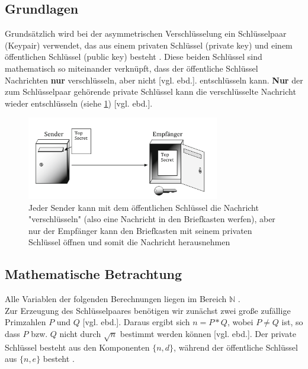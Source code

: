 \documentclass[a4paper,ngerman, headheight=28pt,12pt]{scrartcl}
\newcommand{\vcite}[1]{\cite[vgl.][]{#1}}
\newcommand{\vebd}{[vgl. ebd.]}
\begin{document}
\subsection{Grundlagen}
Grundsätzlich wird bei der asymmetrischen Verschlüsselung ein Schlüsselpaar (Keypair) verwendet, das aus einem privaten Schlüssel (private key) und einem öffentlichen Schlüssel (public key) besteht \vcite{Rsa-Basics}. Diese beiden Schlüssel sind mathematisch so miteinander verknüpft, dass der öffentliche Schlüssel Nachrichten \textbf{nur} verschlüsseln, aber nicht \vebd. entschlüsseln kann. \textbf{Nur} der zum Schlüsselpaar gehörende private Schlüssel kann die verschlüsselte Nachricht wieder entschlüsseln (siehe \cref{fig:E2EE}) \vebd.
\begin{figure}[h]
  \centering
  \includegraphics[width=0.75\textwidth]{Briefkasten-asymm.png}
  \caption{Jeder Sender kann mit dem öffentlichen Schlüssel die Nachricht "verschlüsseln" (also eine Nachricht in den Briefkasten werfen), aber nur der Empfänger kann den Briefkasten mit seinem privaten Schlüssel öffnen und somit die Nachricht herausnehmen\vcite{fig:Rsa-Cryptography} \label{fig:E2EE}}
\end{figure}

\subsection{Mathematische Betrachtung}
Alle Variablen der folgenden Berechnungen liegen im Bereich $\mathbb{N}$ \vcite{RsaGenCond}. \\
Zur Erzeugung des Schlüsselpaares benötigen wir zunächst zwei große zufällige Primzahlen $P$ und $Q$ \vebd. Daraus ergibt sich $n = P * Q$, wobei $P \neq Q$ ist, so dass $P$ bzw. $Q$ nicht durch $\sqrt{n}$ bestimmt werden können \vebd. Der private Schlüssel besteht aus den Komponenten $\{ n, d \}$, während der öffentliche Schlüssel aus $\{ n, e \}$ besteht \vcite{RsaVariables}.
\end{document}
